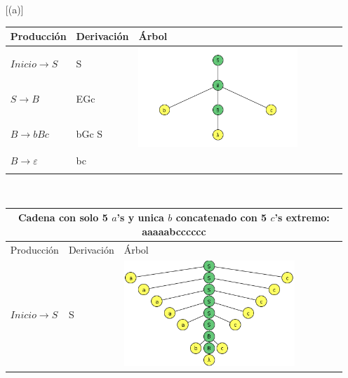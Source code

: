 \documentclass{article}
\begin{document}
\begin{enumerate} [(a)]
\begin{tabular}{|p{5cm}|p{5cm}|p{5cm}|  }
            \hline
            Producción & Derivación & Árbol\\
            \hline
            $ Inicio \to S$ & S & \multirow{3}{*}{
            \begin{minipage}{.3\textwidth}
            \includegraphics[width=0.8\textwidth]{img/eje_f_caso2.png}
            \end{minipage}
            } \\
             $ S \to B$ &  EGc& \\
             $ B \to bBc$ & bGc S & \\
             $ B \to \varepsilon$ & bc&\\
             &&\\
             \hline
            \end{tabular}
            \\
            \begin{tabular}{|p{5cm}|p{5cm}|p{5cm}|  }
            \hline
            \multicolumn{3}{|c|}{Cadena con solo 5 $a$'s  y unica $b$ concatenado con 5 $c$'s extremo: aaaaabcccccc} \\
            \hline
            Producción & Derivación & Árbol\\
            \hline
            $ Inicio \to S$ & S & \multirow{11}{*}{
            \begin{minipage}{.3\textwidth}
            \includegraphics[width=0.8\textwidth]{img/eje_f_caso3.png}

\end{minipage}}
\end{tabular}
\end{enumerate}
\end{document}
